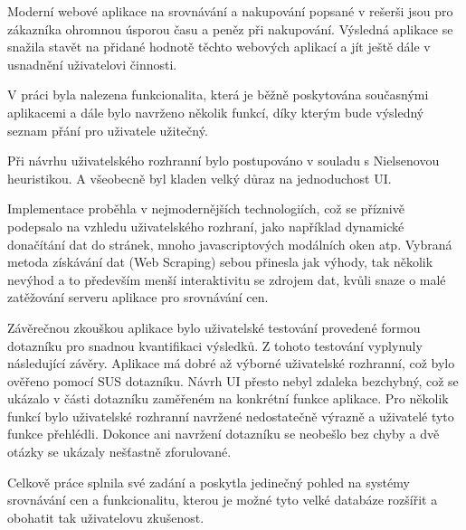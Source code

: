\begin{conclusion}

Moderní webové aplikace na srovnávání a nakupování popsané v rešerši jsou pro zákazníka ohromnou úsporou času a peněz při nakupování. Výsledná aplikace se snažila stavět na přidané hodnotě těchto webových aplikací a jít ještě dále v usnadnění uživatelovi činnosti.

V práci byla nalezena funkcionalita, která je běžně poskytována současnými aplikacemi a dále bylo navrženo několik funkcí, díky kterým bude výsledný seznam přání pro uživatele užitečný.

Při návrhu uživatelského rozhranní bylo postupováno v souladu s Nielsenovou heuristikou\cite{molich1990improving}. A všeobecně byl kladen velký důraz na jednoduchost UI.

Implementace proběhla v nejmodernějších technologiích, což se příznivě podepsalo na vzhledu uživatelského rozhraní, jako například dynamické donačítání dat do stránek, mnoho javascriptových modálních oken atp. Vybraná metoda získávání dat (Web Scraping) sebou přinesla jak výhody, tak několik nevýhod a to především menší interaktivitu se zdrojem dat, kvůli snaze o malé zatěžování serveru aplikace pro srovnávání cen.

Závěrečnou zkouškou aplikace bylo uživatelské testování provedené formou dotazníku pro snadnou kvantifikaci výsledků. Z tohoto testování vyplynuly následující závěry. Aplikace má dobré až výborné uživatelské rozhranní, což bylo ověřeno pomocí SUS dotazníku. Návrh UI přesto nebyl zdaleka bezchybný, což se ukázalo v části dotazníku zaměřeném na konkrétní funkce aplikace. Pro několik funkcí bylo uživatelské rozhranní navržené nedostatečně výrazně a uživatelé tyto funkce přehlédli. Dokonce ani navržení dotazníku se neobešlo bez chyby a dvě otázky se ukázaly nešťastně zforulované.

Celkově práce splnila své zadání a poskytla jedinečný pohled na systémy srovnávání cen a funkcionalitu, kterou je možné tyto velké databáze rozšířit a obohatit tak uživatelovu zkušenost.


\end{conclusion}